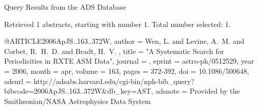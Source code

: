 Query Results from the ADS Database


Retrieved 1 abstracts, starting with number 1.  Total number selected: 1.

@ARTICLE{2006ApJS..163..372W,
   author = {{Wen}, L. and {Levine}, A.~M. and {Corbet}, R.~H.~D. and {Bradt}, H.~V.
	},
    title = "{A Systematic Search for Periodicities in RXTE ASM Data}",
  journal = {\apjs},
   eprint = {astro-ph/0512529},
     year = 2006,
    month = apr,
   volume = 163,
    pages = {372-392},
      doi = {10.1086/500648},
   adsurl = {http://adsabs.harvard.edu/cgi-bin/nph-bib_query?bibcode=2006ApJS..163..372W&db_key=AST},
  adsnote = {Provided by the Smithsonian/NASA Astrophysics Data System}
}


